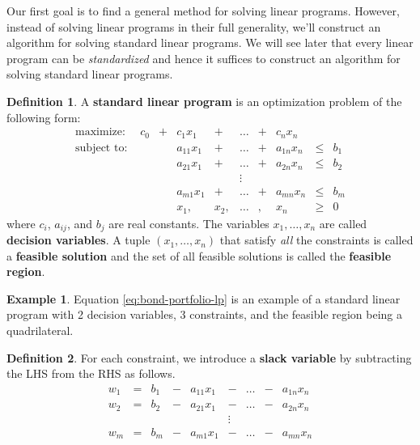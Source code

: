\documentclass[
]{book}
\theoremstyle{definition}
\newtheorem{definition}{Definition}[chapter]
\theoremstyle{definition}
\newtheorem{example}{Example}[chapter]
\theoremstyle{definition}
\theoremstyle{definition}
\theoremstyle{remark}
\begin{document}
Our first goal is to find a general method for solving linear programs.
However, instead of solving linear programs in their full generality, we'll construct an algorithm for solving standard linear programs.
We will see later that every linear program can be \emph{standardized} and hence it suffices to construct an algorithm for solving standard linear programs.

\begin{definition}
A \textbf{standard linear program} is an optimization problem of the following form:
\begin{equation}
  \begin{array}{lrrrrrrrrr}
    \mbox{maximize: } & c_0 & + & c_1 x_1 & + & \dots & + & c_n x_n & \\
    \mbox{subject to: } 
      & & & a_{11} x_1 & + & \dots & + & a_{1n} x_n & \leq & b_1 \\
      & & & a_{21} x_1 & + & \dots & + & a_{2n} x_n & \leq & b_2 \\
      & & & & & \vdots &  \\
      & & & a_{m1} x_1 & + & \dots & + & a_{mn} x_n & \leq & b_m \\
      & & & x_1, & x_2, & \dots &, & x_n & \geq & 0
  \end{array} 
  \label{eq:standard-lp}
\end{equation}
where \(c_i\), \(a_{ij}\), and \(b_j\) are real constants. The variables \(x_1, \dots, x_n\) are called \textbf{decision variables}. A tuple \((x_1, \dots, x_n)\) that satisfy \emph{all} the constraints is called a \textbf{feasible solution} and the set of all feasible solutions is called the \textbf{feasible region}.
\end{definition}

\begin{example}
Equation \eqref{eq:bond-portfolio-lp} is an example of a standard linear program with 2 decision variables, 3 constraints, and the feasible region being a quadrilateral.
\end{example}

\begin{definition}
For each constraint, we introduce a \textbf{slack variable} by subtracting the LHS from the RHS as follows.
\begin{equation}
  \begin{array}{lrrrrrrrrr}
      w_1 & = & b_1 & - & a_{11} x_1 & - & \dots & - & a_{1n} x_n \\
      w_2 & = & b_2 & - & a_{21} x_1 & - & \dots & - & a_{2n} x_n \\
      & & & & & \vdots &  \\
      w_m & = & b_m & - & a_{m1} x_1 & - & \dots & - & a_{mn} x_n 
  \end{array} 
  \label{eq:slack-variables-def}
\end{equation}
\end{definition}
\end{document}
